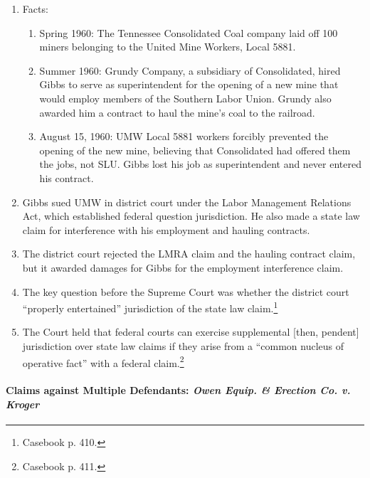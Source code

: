 \begin{enumerate}
    \item Facts:
    \begin{enumerate}
        \item Spring 1960: The Tennessee Consolidated Coal company laid off 100 miners belonging to the United Mine Workers, Local 5881.
        \item Summer 1960: Grundy Company, a subsidiary of Consolidated, hired Gibbs to serve as superintendent for the opening of a new mine that would employ members of the Southern Labor Union. Grundy also awarded him a contract to haul the mine's coal to the railroad.
        \item August 15, 1960: UMW Local 5881 workers forcibly prevented the opening of the new mine, believing that Consolidated had offered them the jobs, not SLU. Gibbs lost his job as superintendent and never entered his contract.
    \end{enumerate}
    \item Gibbs sued UMW in district court under the Labor Management Relations Act, which established federal question jurisdiction. He also made a state law claim for interference with his employment and hauling contracts.
    \item The district court rejected the LMRA claim and the hauling contract claim, but it awarded damages for Gibbs for the employment interference claim.
    \item The key question before the Supreme Court was whether the district court ``properly entertained'' jurisdiction of the state law claim.\footnote{Casebook p. 410.}
    \item The Court held that federal courts can exercise supplemental [then, pendent] jurisdiction over state law claims if they arise from a ``common nucleus of operative fact'' with a federal claim.\footnote{Casebook p. 411.}
\end{enumerate}

\paragraph{Claims against Multiple Defendants: \emph{Owen Equip. \& Erection Co. v. Kroger}}

